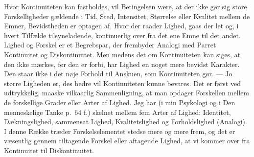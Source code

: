 \documentclass[12pt]{article}
\newcommand{\opage}[1]{\marginnote{\footnotesize\textit{[#1]}}}
\begin{document}
Hvor Kontinuiteten kan fastholdes, vil Betingelsen være,
at der ikke gør sig store Forskelligheder gældende i Tid,
Sted, Intensitet, Størrelse eller Kvalitet mellem de Emner, Bevidstheden
er optagen af. Hvor der raader Lighed, gaas der
let og, i hvert Tilfælde tilsyneladende, kontinuerlig over fra
\opage{32} \setcounter{footnote}{0}
det ene Emne til det andet. Lighed og Forskel er et Begrebspar,
der frembyder Analogi med Parret Kontinuitet
og Diskontinuitet. Men medens det om Kontinuiteten kan
siges, at den ikke mærkes, før den er forbi, har Lighed
en noget mere bevidst Karakter. Den staar ikke i det nøje
Forhold til Anskuen, som Kontinuiteten gør. --- Jo større Ligheden
er, des bedre vil Kontinuiteten kunne bevares. Det
er først ved udtrykkelig, maaske vilkaarlig Sammenligning,
at man opdager Forskellen mellem de forskellige Grader
eller Arter af Lighed. Jeg har (i min Psykologi og i \guillemotright Den
menneskelige Tanke\guillemotleft{} p.~64 f.) skelnet mellem fem Arter af
Lighed: Identitet, Dækningslighed, sammensat Lighed, Kvalitetslighed
og Forholdslighed (Analogi). I denne Række træder
Forskelselementet stedse mere og mere frem, og det
er væsentlig gennem tiltagende Forskel eller aftagende Lighed,
at vi kommer over fra Kontinuitet til Diskontinuitet.
\end{document}

